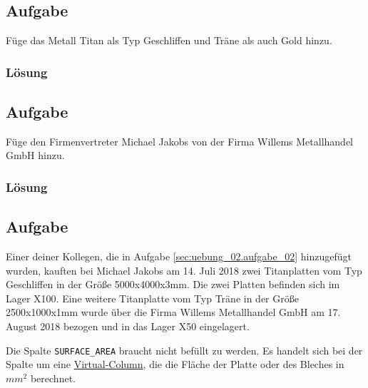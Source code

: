\subsection{Aufgabe}
\label{sec:uebung_02.aufgabe_04}
Füge das Metall Titan als Typ \glqq{}Geschliffen\grqq{} und \glqq{}Träne\grqq{} als auch Gold hinzu.

\subsubsection*{Lösung}
\label{sec:uebung_02.aufgabe_04.loesung}

\subsection{Aufgabe}
\label{sec:uebung_02.aufgabe_05}
Füge den Firmenvertreter Michael Jakobs von der Firma Willems Metallhandel GmbH hinzu.

\subsubsection*{Lösung}
\label{sec:uebung_02.aufgabe_05.loesung}

\subsection{Aufgabe}
\label{sec:uebung_02.aufgabe_06}
Einer deiner Kollegen, die in Aufgabe \ref{sec:uebung_02.aufgabe_02} hinzugefügt wurden, kauften bei Michael Jakobs am 14. Juli 2018 zwei Titanplatten vom Typ \glqq{}Geschliffen\grqq{} in der Größe 5000x4000x3mm. Die zwei Platten befinden sich im Lager X100. Eine weitere Titanplatte vom Typ \glqq{}Träne\grqq{} in der Größe 2500x1000x1mm wurde über die Firma  Willems Metallhandel GmbH am 17. August 2018 bezogen und in das Lager X50 eingelagert.

\begin{info-popup}
  Die Spalte \texttt{SURFACE\_AREA} braucht nicht befüllt zu werden. Es handelt sich bei der Spalte um eine \href{https://oracle-base.com/articles/11g/virtual-columns-11gr1}{Virtual-Column}, die die Fläche der Platte oder des Bleches in $mm^2$ berechnet.
\end{info-popup}

